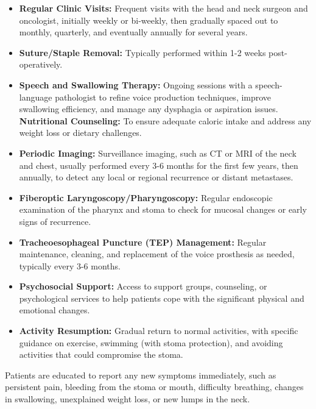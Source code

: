 \begin{itemize}
  \item \textbf{Regular Clinic Visits:} Frequent visits with the head and neck surgeon and oncologist, initially weekly or bi-weekly, then gradually spaced out to monthly, quarterly, and eventually annually for several years.
  \item \textbf{Suture/Staple Removal:} Typically performed within 1-2 weeks post-operatively.
  \item \textbf{Speech and Swallowing Therapy:} Ongoing sessions with a speech-language pathologist to refine voice production techniques, improve swallowing efficiency, and manage any dysphagia or aspiration issues.
  \textbf{Nutritional Counseling:} To ensure adequate caloric intake and address any weight loss or dietary challenges.
  \item \textbf{Periodic Imaging:} Surveillance imaging, such as CT or MRI of the neck and chest, usually performed every 3-6 months for the first few years, then annually, to detect any local or regional recurrence or distant metastases.
  \item \textbf{Fiberoptic Laryngoscopy/Pharyngoscopy:} Regular endoscopic examination of the pharynx and stoma to check for mucosal changes or early signs of recurrence.
  \item \textbf{Tracheoesophageal Puncture (TEP) Management:} Regular maintenance, cleaning, and replacement of the voice prosthesis as needed, typically every 3-6 months.
  \item \textbf{Psychosocial Support:} Access to support groups, counseling, or psychological services to help patients cope with the significant physical and emotional changes.
  \item \textbf{Activity Resumption:} Gradual return to normal activities, with specific guidance on exercise, swimming (with stoma protection), and avoiding activities that could compromise the stoma.
\end{itemize}
Patients are educated to report any new symptoms immediately, such as persistent pain, bleeding from the stoma or mouth, difficulty breathing, changes in swallowing, unexplained weight loss, or new lumps in the neck.


